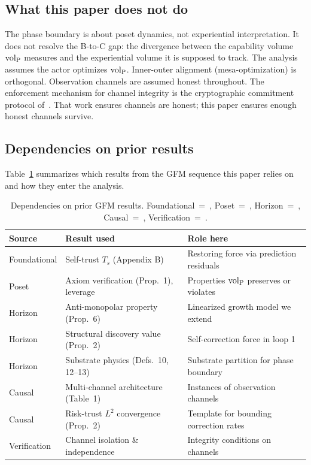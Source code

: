 \subsection{What this paper does not do}

The phase boundary is about poset dynamics, not experiential
interpretation.  It does not resolve the B-to-C gap: the divergence
between the capability volume ${\operatorname{vol}_{\mathrm{P}}}$ measures and the experiential
volume it is supposed to track.  The analysis assumes the actor
optimizes ${\operatorname{vol}_{\mathrm{P}}}$.  Inner-outer alignment (mesa-optimization) is
orthogonal.  Observation channels are assumed honest throughout.  The
enforcement mechanism for channel integrity is the cryptographic
commitment protocol of~\citet{lasser2026exo}.
That work ensures channels are honest; this paper ensures enough honest
channels survive.

\subsection{Dependencies on prior results}

Table~\ref{tab:dependencies} summarizes which results from the GFM sequence
this paper relies on and how they enter the analysis.

\begin{table}[h]
\centering
\small
\begin{tabular}{@{}lll@{}}
\toprule
\textbf{Source} & \textbf{Result used} & \textbf{Role here} \\
\midrule
Foundational & Self-trust $T_s$ (Appendix B) & Restoring force via prediction residuals \\
Poset        & Axiom verification (Prop.\ 1), leverage & Properties ${\operatorname{vol}_{\mathrm{P}}}$ preserves or violates \\
Horizon      & Anti-monopolar property (Prop.\ 6) & Linearized growth model we extend \\
Horizon      & Structural discovery value (Prop.\ 2) & Self-correction force in loop 1 \\
Horizon      & Substrate physics (Defs.\ 10, 12--13) & Substrate partition for phase boundary \\
Causal       & Multi-channel architecture (Table~1) & Instances of observation channels \\
Causal       & Risk-trust $L^2$ convergence (Prop.\ 2) & Template for bounding correction rates \\
Verification & Channel isolation \& independence & Integrity conditions on channels \\
\bottomrule
\end{tabular}
\caption{Dependencies on prior GFM results.
  Foundational~=~\citet{lasser2026gfm},
  Poset~=~\citet{lasser2026poset},
  Horizon~=~\citet{lasser2026horizon},
  Causal~=~\citet{lasser2026scm},
  Verification~=~\citet{lasser2026exo}.}
\label{tab:dependencies}
\end{table}
